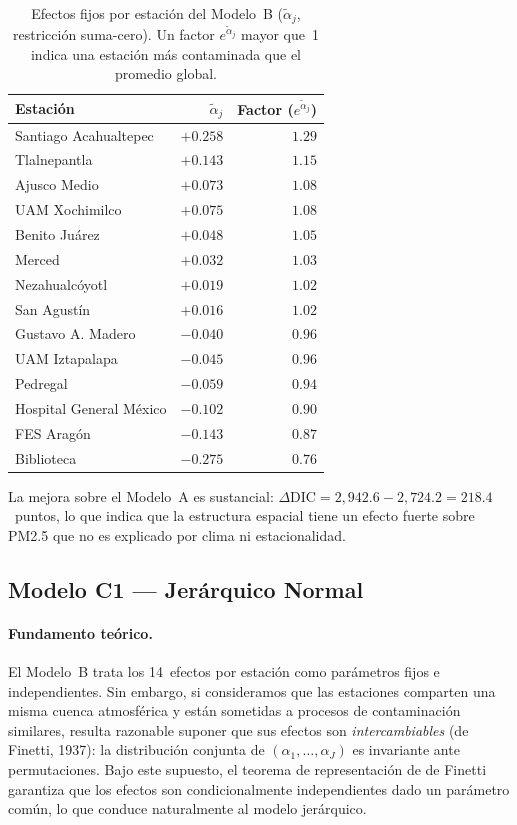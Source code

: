 \documentclass[12pt]{article}
\begin{document}
\begin{table}[H]
\centering
\caption{Efectos fijos por estaci\'on del Modelo~B ($\tilde\alpha_j$,
         restricci\'on suma-cero).
         Un factor $e^{\tilde\alpha_j}$ mayor que~1 indica una estaci\'on
         m\'as contaminada que el promedio global.}
\label{tab:alphaj_B}
\begin{tabular}{>{\raggedright\arraybackslash}p{5.5cm}rr}
\toprule
Estaci\'on & $\tilde\alpha_j$ & Factor ($e^{\tilde\alpha_j}$) \\
\midrule
Santiago Acahualtepec   & $+0.258$ & $1.29$ \\
Tlalnepantla            & $+0.143$ & $1.15$ \\
Ajusco Medio            & $+0.073$ & $1.08$ \\
UAM Xochimilco          & $+0.075$ & $1.08$ \\
Benito Ju\'arez         & $+0.048$ & $1.05$ \\
Merced                  & $+0.032$ & $1.03$ \\
Nezahualc\'oyotl        & $+0.019$ & $1.02$ \\
San Agust\'in           & $+0.016$ & $1.02$ \\
Gustavo A. Madero       & $-0.040$ & $0.96$ \\
UAM Iztapalapa          & $-0.045$ & $0.96$ \\
Pedregal                & $-0.059$ & $0.94$ \\
Hospital General M\'exico& $-0.102$ & $0.90$ \\
FES Arag\'on            & $-0.143$ & $0.87$ \\
Biblioteca              & $-0.275$ & $0.76$ \\
\bottomrule
\end{tabular}
\end{table}

La mejora sobre el Modelo~A es sustancial:
$\Delta\text{DIC} = 2{,}942.6 - 2{,}724.2 = 218.4$~puntos,
lo que indica que la estructura espacial tiene un efecto fuerte
sobre PM2.5 que no es explicado por clima ni estacionalidad.


\subsection{Modelo C1 --- Jer\'arquico Normal}

\paragraph{Fundamento te\'orico.}
El Modelo~B trata los 14~efectos por estaci\'on como par\'ametros fijos
e independientes.
Sin embargo, si consideramos que las estaciones comparten una misma
cuenca atmosf\'erica y est\'an sometidas a procesos de contaminaci\'on
similares, resulta razonable suponer que sus efectos son
\emph{intercambiables} (de Finetti, 1937): la distribuci\'on conjunta
de $(\alpha_1,\ldots,\alpha_J)$ es invariante ante permutaciones.
Bajo este supuesto, el teorema de representaci\'on de de Finetti garantiza
que los efectos son condicionalmente independientes dado un par\'ametro
com\'un, lo que conduce naturalmente al modelo jer\'arquico.
\end{document}
